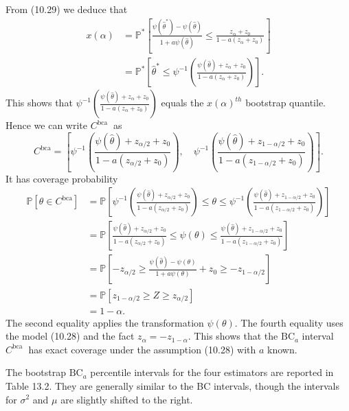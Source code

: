 \documentclass[10pt]{article}
\begin{document}
From (10.29) we deduce that
$$
\begin{aligned}
x(\alpha) &=\mathbb{P}^{*}\left[\frac{\psi\left(\widehat{\theta}^{*}\right)-\psi(\widehat{\theta})}{1+a \psi(\widehat{\theta})} \leq \frac{z_{\alpha}+z_{0}}{1-a\left(z_{\alpha}+z_{0}\right)}\right] \\
&=\mathbb{P}^{*}\left[\widehat{\theta}^{*} \leq \psi^{-1}\left(\frac{\psi(\widehat{\theta})+z_{\alpha}+z_{0}}{1-a\left(z_{\alpha}+z_{0}\right)}\right)\right] .
\end{aligned}
$$
This shows that $\psi^{-1}\left(\frac{\psi(\widehat{\theta})+z_{\alpha}+z_{0}}{1-a\left(z_{\alpha}+z_{0}\right)}\right)$ equals the $x(\alpha)^{t h}$ bootstrap quantile. Hence we can write $C^{\text {bca }}$ as
$$
C^{\mathrm{bca}}=\left[\psi^{-1}\left(\frac{\psi(\widehat{\theta})+z_{\alpha / 2}+z_{0}}{1-a\left(z_{\alpha / 2}+z_{0}\right)}\right), \quad \psi^{-1}\left(\frac{\psi(\widehat{\theta})+z_{1-\alpha / 2}+z_{0}}{1-a\left(z_{1-\alpha / 2}+z_{0}\right)}\right)\right] .
$$
It has coverage probability
$$
\begin{aligned}
\mathbb{P}\left[\theta \in C^{\mathrm{bca}}\right] &=\mathbb{P}\left[\psi^{-1}\left(\frac{\psi(\widehat{\theta})+z_{\alpha / 2}+z_{0}}{1-a\left(z_{\alpha / 2}+z_{0}\right)}\right) \leq \theta \leq \psi^{-1}\left(\frac{\psi(\widehat{\theta})+z_{1-\alpha / 2}+z_{0}}{1-a\left(z_{1-\alpha / 2}+z_{0}\right)}\right)\right] \\
&=\mathbb{P}\left[\frac{\psi(\widehat{\theta})+z_{\alpha / 2}+z_{0}}{1-a\left(z_{\alpha / 2}+z_{0}\right)} \leq \psi(\theta) \leq \frac{\psi(\widehat{\theta})+z_{1-\alpha / 2}+z_{0}}{1-a\left(z_{1-\alpha / 2}+z_{0}\right)}\right] \\
&=\mathbb{P}\left[-z_{\alpha / 2} \geq \frac{\psi(\widehat{\theta})-\psi(\theta)}{1+a \psi(\theta)}+z_{0} \geq-z_{1-\alpha / 2}\right] \\
&=\mathbb{P}\left[z_{1-\alpha / 2} \geq Z \geq z_{\alpha / 2}\right] \\
&=1-\alpha .
\end{aligned}
$$
The second equality applies the transformation $\psi(\theta)$. The fourth equality uses the model (10.28) and the fact $z_{\alpha}=-z_{1-\alpha}$. This shows that the $\mathrm{BC}_{a}$ interval $C^{\text {bca }}$ has exact coverage under the assumption (10.28) with $a$ known.

The bootstrap $\mathrm{BC}_{a}$ percentile intervals for the four estimators are reported in Table 13.2. They are generally similar to the BC intervals, though the intervals for $\sigma^{2}$ and $\mu$ are slightly shifted to the right.
\end{document}
